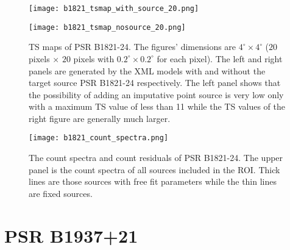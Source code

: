 \documentclass[12pt]{report}
\begin{document}
      \begin{figure}[!ht]
        \begin{center}
        \begin{minipage}{0.46\textwidth}
          \begin{center} 
            \texttt{[image: b1821\_tsmap\_with\_source\_20.png]}
          \end{center}
        \end{minipage}
        \begin{minipage}{0.45\textwidth}
          \begin{center}
            \texttt{[image: b1821\_tsmap\_nosource\_20.png]}
          \end{center}
        \end{minipage}
      \end{center}
        \caption{TS maps of PSR B1821-24. The figures' dimensions are $4^{\circ} \times4^{\circ}$ 
        ($20$ pixels $\times$ $20$ pixels with $0.2^{\circ} \times 0.2^{\circ}$ for each pixel). 
        The left and right panels are generated by the XML models with and without the 
        target source PSR B1821-24 respectively. The left panel shows that the possibility 
        of adding an imputative point source is very low only with a maximum TS value of 
        less than 11 while the TS values of the right figure are generally much larger.}
          \label{fig: b1821_tsmap_comparison_20}
      \end{figure}
      \vspace{1cm}
            
      \begin{figure}[!htp]
        \centering
        \texttt{[image: b1821\_count\_spectra.png]}
        \caption{The count spectra and count residuals of PSR B1821-24.
                The upper panel is the count spectra of all sources included in the 
                ROI. Thick lines are those sources with free fit parameters 
                while the thin lines are fixed sources.} 
        \label{fig: b1821_count_spectra}
      \end{figure}


  \section{PSR B1937+21}
\end{document}
